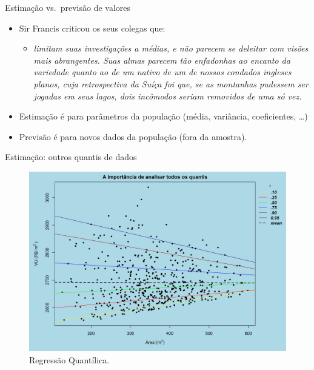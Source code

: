 \documentclass[9pt,ignorenonframetext,aspectratio=169]{beamer}
\providecommand{\tightlist}{%
  \setlength{\itemsep}{0pt}\setlength{\parskip}{0pt}}
\begin{document}
\begin{frame}{Estimação vs.~previsão de valores}
\protect\hypertarget{estimauxe7uxe3o-vs.-previsuxe3o-de-valores}{}

\begin{itemize}[<+->]
\tightlist
\item
  Sir Francis \textcite[p.~62]{galton}
  \autocite[\emph{apud}][p.~350]{koenker2000} criticou os seus colegas
  que:

  \begin{itemize}[<+->]
  \tightlist
  \item
    \emph{limitam suas investigações a médias, e não parecem se deleitar com
    visões mais abrangentes. Suas almas parecem tão enfadonhas ao encanto da
    variedade quanto ao de um nativo de um de nossos condados ingleses planos, cuja
    retrospectiva da Suíça foi que, se as montanhas pudessem ser jogadas em seus
    lagos, dois incômodos seriam removidos de uma só vez.}
  \end{itemize}
\item
  Estimação é para parâmetros da população (média, variância,
  coeficientes, \ldots)
\item
  Previsão é para novos dados da população (fora da amostra).
\end{itemize}

\end{frame}

\begin{frame}{Estimação: outros quantis de dados}
\protect\hypertarget{estimauxe7uxe3o-outros-quantis-de-dados}{}

\begin{figure}

{\centering \includegraphics[width=0.5\linewidth]{images/qr-1} 

}

\caption{Regressão Quantílica.}\label{fig:qr}
\end{figure}

\end{frame}
\end{document}

